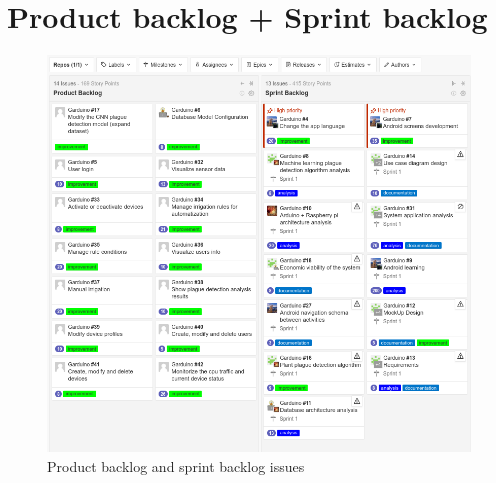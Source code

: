 \documentclass[11pt,a4paper]{article}
\begin{document}
\section{Product backlog + Sprint backlog}
\begin{figure}[hbtp]
\centering
\includegraphics[scale=0.6]{figures/backlog.png}
\caption{Product backlog and sprint backlog issues}
\end{figure}
\end{document}
